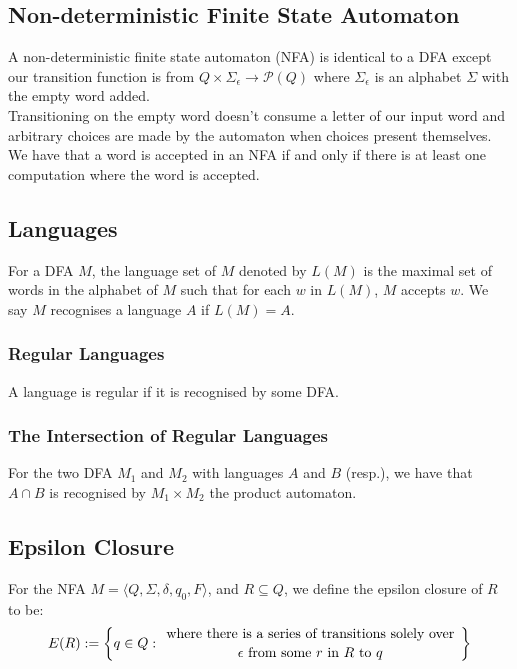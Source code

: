\subsection{Non-deterministic Finite State Automaton}

A non-deterministic finite state automaton (NFA) is identical
to a DFA except our transition function is from 
$Q \times \Sigma_\epsilon \to \mathcal{P}(Q)$ where
$\Sigma_\epsilon$ is an alphabet $\Sigma$ with the empty word
added.
\\[\baselineskip]
Transitioning on the empty word doesn't consume a letter of our
input word and arbitrary choices are made by the automaton when
choices present themselves. We have that a word is accepted
in an NFA if and only if there is at least one computation where 
the word is accepted.
    
\subsection{Languages}

For a DFA $M$, the language set of $M$ denoted by $L(M)$
is the maximal set of words in the alphabet of $M$ such that
for each $w$ in $L(M)$, $M$ accepts $w$. We say $M$ recognises
a language $A$ if $L(M) = A$.

\subsubsection{Regular Languages}

A language is regular if it is recognised by some DFA.

\subsubsection{The Intersection of Regular Languages}

For the two DFA $M_1$ and $M_2$ with languages
$A$ and $B$ (resp.), we have that $A \cap B$ is
recognised by $M_1 \times M_2$ the product automaton.

\subsection{Epsilon Closure}

For the NFA $M =  \langle Q, \Sigma, \delta, q_0, F \rangle$, 
and $R \subseteq Q$, we define the epsilon closure
of $R$ to be: \begin{gather*}
    E(R) := \left\{
        q \in Q : \bfrac{
        \text{ where there is a series of 
        transitions solely over }
    }{
        \epsilon \text{ from some } r \text{ in } 
        R \text{ to } q
    }\right\}
\end{gather*}

